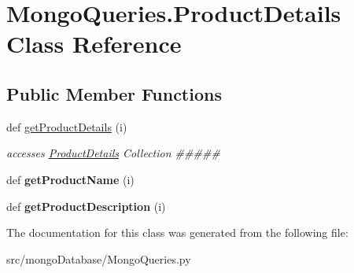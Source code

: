\hypertarget{class_mongo_queries_1_1_product_details}{}\section{Mongo\+Queries.\+Product\+Details Class Reference}
\label{class_mongo_queries_1_1_product_details}
\subsection*{Public Member Functions}
\begin{DoxyCompactItemize}
\item 
\hypertarget{class_mongo_queries_1_1_product_details_acfcdac1a1f030b4753d91ff1e763dab2}{}\label{class_mongo_queries_1_1_product_details_acfcdac1a1f030b4753d91ff1e763dab2} 
def \hyperlink{class_mongo_queries_1_1_product_details_acfcdac1a1f030b4753d91ff1e763dab2}{get\+Product\+Details} (i)
\begin{DoxyCompactList}\small\item\em accesses \hyperlink{class_mongo_queries_1_1_product_details}{Product\+Details} Collection \#\#\#\#\# \end{DoxyCompactList}\item 
\hypertarget{class_mongo_queries_1_1_product_details_a3eb00d0b74e93e53d2760879a3bf2032}{}\label{class_mongo_queries_1_1_product_details_a3eb00d0b74e93e53d2760879a3bf2032} 
def {\bfseries get\+Product\+Name} (i)
\item 
\hypertarget{class_mongo_queries_1_1_product_details_a5c2c0e637a07d05736758bc59b85312e}{}\label{class_mongo_queries_1_1_product_details_a5c2c0e637a07d05736758bc59b85312e} 
def {\bfseries get\+Product\+Description} (i)
\end{DoxyCompactItemize}


The documentation for this class was generated from the following file\+:\begin{DoxyCompactItemize}
\item 
src/mongo\+Database/Mongo\+Queries.\+py\end{DoxyCompactItemize}
